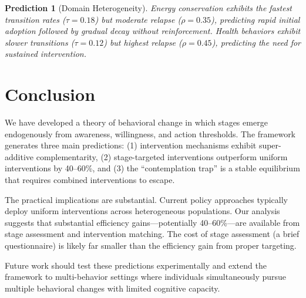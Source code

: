 \documentclass[12pt]{article}
\newtheorem{prediction}{Prediction}
\begin{document}
\begin{prediction}[Domain Heterogeneity]
Energy conservation exhibits the fastest transition rates ($\tau = 0.18$) but moderate relapse ($\rho = 0.35$), predicting rapid initial adoption followed by gradual decay without reinforcement. Health behaviors exhibit slower transitions ($\tau = 0.12$) but highest relapse ($\rho = 0.45$), predicting the need for sustained intervention.
\end{prediction}



\section{Conclusion}

We have developed a theory of behavioral change in which stages emerge endogenously from awareness, willingness, and action thresholds. The framework generates three main predictions: (1) intervention mechanisms exhibit super-additive complementarity, (2) stage-targeted interventions outperform uniform interventions by 40--60\%, and (3) the ``contemplation trap'' is a stable equilibrium that requires combined interventions to escape.

The practical implications are substantial. Current policy approaches typically deploy uniform interventions across heterogeneous populations. Our analysis suggests that substantial efficiency gains---potentially 40--60\%---are available from stage assessment and intervention matching. The cost of stage assessment (a brief questionnaire) is likely far smaller than the efficiency gain from proper targeting.

Future work should test these predictions experimentally and extend the framework to multi-behavior settings where individuals simultaneously pursue multiple behavioral changes with limited cognitive capacity.



\end{document}
